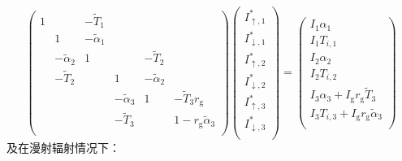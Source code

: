 \begin{equation}
  \left(\begin{matrix}1&&-{\widetilde{T}}_1&&&\\&1&-{\widetilde{\alpha}}_1&&&\\&-{\widetilde{\alpha}}_2&1&&-{\widetilde{T}}_2&\\&-{\widetilde{T}}_2&&1&-{\widetilde{\alpha}}_2&\\&&&-{\widetilde{\alpha}}_3&1&-{\widetilde{T}}_3r_{\mathrm {g}}\\&&&-{\widetilde{T}}_3&&1-r_{\mathrm {g}}{\widetilde{\alpha}}_3\\\end{matrix}\right)\left(\begin{matrix}I_{\uparrow,1}^\ast\\I_{\downarrow,1}^\ast\\I_{\uparrow,2}^\ast\\I_{\downarrow,2}^\ast\\I_{\uparrow,3}^\ast\\I_{\downarrow,3}^\ast\\\end{matrix}\right)=\left(\begin{matrix}I_1\alpha_1\\I_1T_{i,1}\\I_2\alpha_2\\I_2T_{i,2}\\I_3\alpha_3+I_{\mathrm {g}}r_{\mathrm {g}}{\widetilde{T}}_3\\I_3T_{i,3}+I_{\mathrm {g}}r_{\mathrm {g}}{\widetilde{\alpha}}_3\\\end{matrix}\right)
\end{equation}
及在漫射辐射情况下：
